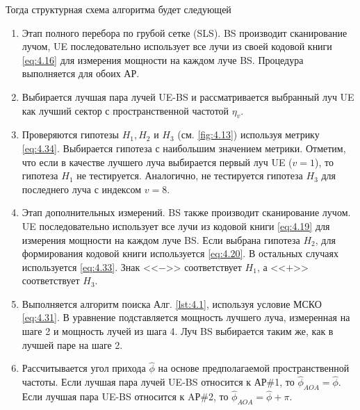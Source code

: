 Тогда структурная схема алгоритма будет следующей
\begin{enumerate}[label=\textbf{Шаг \arabic*:}]
    \item Этап полного перебора по грубой сетке (SLS). BS производит сканирование лучом, UE
          последовательно использует все лучи из своей кодовой книги \eqref{eq:4.16} для
          измерения мощности на каждом луче BS. Процедура выполняется для обоих АР.
    \item Выбирается лучшая пара лучей UE-BS и рассматривается выбранный луч UE
          как лучший сектор с пространственной частотой $\eta_v$.
    \item Проверяются гипотезы $H_1, H_2$ и $H_3$ (см. \ref{fig:4.13}) используя метрику \eqref{eq:4.34}.
          Выбирается гипотеза с наибольшим значением метрики. Отметим, что если в
          качестве лучшего луча выбирается первый луч UE ($v=1$), то гипотеза
          $H_1$ не тестируется.
          Аналогично, не тестируется гипотеза $H_3$ для последнего луча с
          индексом $v=8$.  \item  Этап дополнительных измерений. BS также
          производит сканирование лучом.  UE последовательно использует все лучи
          из кодовой книги \eqref{eq:4.19} для измерения мощности на каждом луче
          BS. Если выбрана гипотеза $H_2$, для формирования кодовой книги
          используется \eqref{eq:4.20}.  В остальных случаях используется
          \eqref{eq:4.33}. Знак <<$-$>> соответствует $H_1$, а <<$+$>>
          соответствует  $H_3$.
    \item Выполняется алгоритм поиска Алг. \ref{lst:4.1}, используя условие МСКО
          \eqref{eq:4.31}. В уравнение подставляется мощность лучшего луча, измеренная
          на шаге 2 и мощность лучей из шага 4. Луч BS выбирается таким же, как в
          лучшей паре на шаге 2.
    \item Рассчитывается угол прихода $\hat \phi$ на основе предполагаемой
          пространственной частоты. Если лучшая пара лучей UE-BS относится к АР\#1, то
          $\hat \phi_{AOA} = \hat \phi$. Если лучшая пара UE-BS относится к AР\#2, то
          $\hat \phi_{AOA} = \hat \phi + \pi$.
\end{enumerate}


